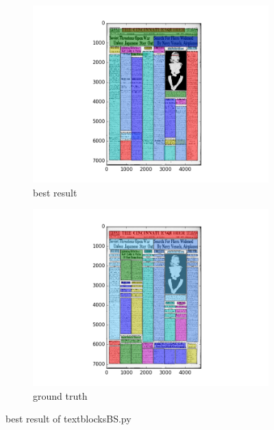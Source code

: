 \documentclass[a4paper,10pt]{article}
\begin{document}
\newpage

					\begin{figure}
					\centering
					\begin{subfigure}{.5\textwidth}
					  \centering
					  \includegraphics[width=10cm]
					{textblocksBS.py.best.png}
					  \caption{best result}
					  \label{fig:sub1}
					\end{subfigure}%
					\begin{subfigure}{.5\textwidth}
					  \centering
					  \includegraphics[width=10cm]
					{textblocksBS.py.gt.best.png}
					  \caption{ground truth}
					  \label{fig:sub2}
					\end{subfigure}
					\caption
					{best result of textblocksBS.py}
					\label{fig:test}
					\end{figure}
					
\end{document}
